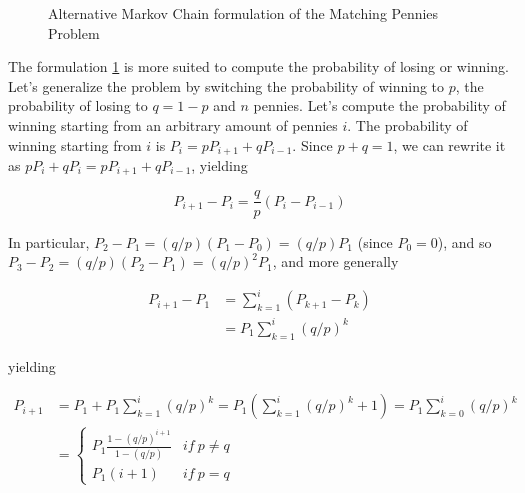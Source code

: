 \documentclass[12pt, a4paper]{article} %
\begin{document}
\begin{enumerate}[label=(\alph*)]
\begin{figure}[H]
  \caption{Alternative Markov Chain formulation of the Matching Pennies Problem} \label{fig:MC3}
  \end{figure}

  The formulation \ref{fig:MC3} is more suited to compute the probability of losing or winning. Let's generalize the problem by switching the probability of winning to $p$, the probability of losing to $q = 1 - p$ and $n$ pennies. Let's compute the probability of winning starting from an arbitrary amount of pennies $i$. The probability of winning starting from $i$ is $P_{i} = pP_{i+1} + qP_{i-1}$. Since $p + q = 1$, we can rewrite it as $pP_{i}+ qP_{i} = pP_{i+1} + qP_{i-1}$, yielding

  \begin{equation*}
    P_{i+1} - P_{i} = \frac{q}{p}(P_{i} - P_{i-1})
  \end{equation*}

  In particular, $P_{2} - P_{1} = (q/p)(P_{1} - P_{0}) = (q/p)P_{1}$ (since $P_{0} = 0$), and so $P_{3} - P_{2} = (q/p)(P_{2}- P_{1}) = (q/p)^{2}P_{1}$, and more generally

  \begin{align*}
    P_{i+1} - P_{1} &= \sum_{k=1}^{i}(P_{k+1} - P_{k})\\
                    &=  P_1 \sum_{k=1}^{i} (q/p)^k
  \end{align*}

  yielding

  \begin{align}\label{eq:1}
    P_{i+1} &= P_{1} + P_1 \sum_{k=1}^{i} (q/p)^k = P_1 (\sum_{k=1}^{i} (q/p)^k + 1) = P_1 \sum_{k=0}^{i} (q/p)^k\\
           &= \begin{cases}
                 P_{1}\frac{1-(q/p)^{i+1}}{1-(q/p)} & if \ p \neq q\\
                 P_{1}(i + 1) & if \ p = q
             \end{cases}\\
  \end{align}


\end{enumerate}
\end{document}
